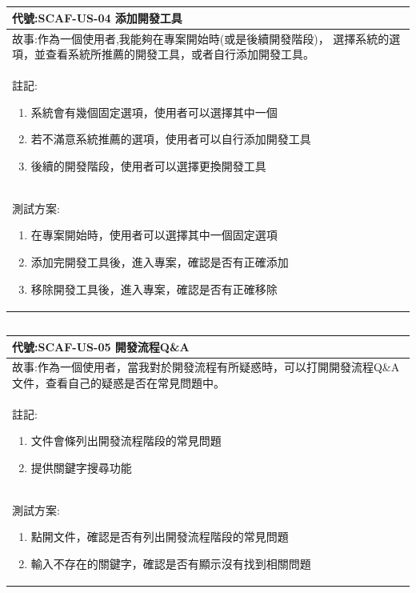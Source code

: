 \documentclass{report}
\begin{document}
\subsection*{}
\fontsize{12}{20}\selectfont
\begin{tabularx}{\textwidth}{|X|}
  \hline
  代號:SCAF-US-04 添加開發工具 \\
  \hline
  故事:作為一個使用者,我能夠在專案開始時(或是後續開發階段)， 選擇系統的選項，並查看系統所推薦的開發工具，或者自行添加開發工具。 \\
  \hline
  註記:
  \begin{enumerate}
    \item 系統會有幾個固定選項，使用者可以選擇其中一個
    \item 若不滿意系統推薦的選項，使用者可以自行添加開發工具
    \item 後續的開發階段，使用者可以選擇更換開發工具
  \end{enumerate} \\
  \hline
  測試方案:
  \begin{enumerate}
    \item 在專案開始時，使用者可以選擇其中一個固定選項
    \item 添加完開發工具後，進入專案，確認是否有正確添加
    \item 移除開發工具後，進入專案，確認是否有正確移除
  \end{enumerate} \\
  \hline
\end{tabularx}

\subsection*{}
\fontsize{12}{20}\selectfont
\begin{tabularx}{\textwidth}{|X|}
  \hline
  代號:SCAF-US-05 開發流程Q\&A \\
  \hline
  故事:作為一個使用者，當我對於開發流程有所疑惑時，可以打開開發流程Q\&A文件，查看自己的疑惑是否在常見問題中。 \\
  \hline
  註記:
  \begin{enumerate}
    \item 文件會條列出開發流程階段的常見問題
    \item 提供關鍵字搜尋功能
  \end{enumerate} \\
  \hline
  測試方案:
  \begin{enumerate}
    \item 點開文件，確認是否有列出開發流程階段的常見問題
    \item 輸入不存在的關鍵字，確認是否有顯示沒有找到相關問題
  \end{enumerate} \\
  \hline
\end{tabularx}
\end{document}
